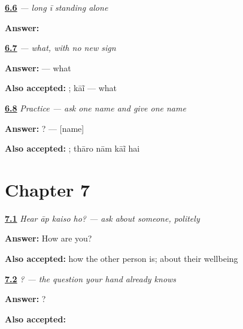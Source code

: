 \noindent\begin{minipage}[t]{\linewidth}
\raggedright
\hyperlink{review-MW-W05-ii-independent-choice}{\textbf{6.6}} \emph{ — long \emph{ī} standing alone}\par
\small \textbf{Answer:} \par
\end{minipage}\par\medskip

\noindent\begin{minipage}[t]{\linewidth}
\raggedright
\hyperlink{review-MW-C05-kain-delayed}{\textbf{6.7}} \emph{ — what, with no new sign}\par
\small \textbf{Answer:}  — what\par
\footnotesize \textbf{Also accepted:} ; kāĩ — what
\end{minipage}\par\medskip

\noindent\begin{minipage}[t]{\linewidth}
\raggedright
\hyperlink{review-MW-C05-practice-name-exchange}{\textbf{6.8}} \emph{Practice — ask one name and give one name}\par
\small \textbf{Answer:}    ? —   {[}name{]} \par
\footnotesize \textbf{Also accepted:}    ; thāro nām kāĩ hai
\end{minipage}\par\medskip

\section*{Chapter 7}

\noindent\begin{minipage}[t]{\linewidth}
\raggedright
\hyperlink{review-MW-C06-hear-question-meaning}{\textbf{7.1}} \emph{Hear \emph{āp kaiso ho?} — ask about someone, politely}\par
\small \textbf{Answer:} How are you?\par
\footnotesize \textbf{Also accepted:} how the other person is; about their wellbeing
\end{minipage}\par\medskip

\noindent\begin{minipage}[t]{\linewidth}
\raggedright
\hyperlink{review-MW-C06-question-write}{\textbf{7.2}} \emph{  ? — the question your hand already knows}\par
\small \textbf{Answer:}   ?\par
\footnotesize \textbf{Also accepted:}   
\end{minipage}\par\medskip


